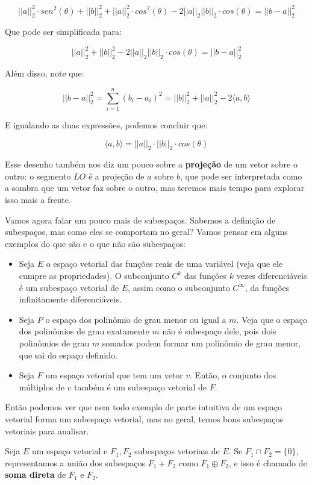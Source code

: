 \documentclass[11pt, a4paper]{article}
\begin{document}
\[||a||_2^2\cdot sen^2(\theta) +||b||_2^2 + ||a||_2^2\cdot cos^2(\theta)-2||a||_2||b||_2\cdot cos(\theta)=||b-a||_2^2\]

Que pode ser simplificada para:

\[||a||_2^2 +||b||_2^2 -2||a||_2||b||_2\cdot cos(\theta)=||b-a||_2^2\]

Além disso, note que:

\[||b-a||_2^2=\sum_{i=1}^{n}{(b_i-a_i)^2}=||b||_2^2+||a||_2^2-2\langle a,b \rangle\]

E igualando as duas expressões, podemos concluir que:

\[\langle a,b \rangle = ||a||_2 \cdot ||b||_2 \cdot cos(\theta)\]

Esse desenho também nos diz um pouco sobre a \textbf{projeção} de um vetor sobre o outro: o segmento \(LO\) é a projeção de \(a\) sobre \(b\), que pode ser interpretada como a sombra que um vetor faz sobre o outro, mas teremos mais tempo para explorar isso mais a frente.

Vamos agora falar um pouco mais de subespaços. Sabemos a definição de subespaços, mas como eles se comportam no geral? Vamos pensar em alguns exemplos do que são e o que não são subespaços:

\begin{itemize}
    \item Seja \(E\) o espaço vetorial das funções reais de uma variável (veja que ele cumpre as propriedades). O subconjunto \(C^{k}\) das funções \(k\) vezes diferenciáveis é um subespaço vetorial de \(E\), assim como o subconjunto \(C^{\infty}\), da funções infinitamente diferenciáveis.

    \item Seja \(P\) o espaço dos polinômio de grau menor ou igual a \(m\). Veja que o espaço dos polinômios de grau exatamente \(m\) não é subespaço dele, pois dois polinômios de grau \(m\) somados podem formar um polinômio de grau menor, que sai do espaço definido.

    \item Seja \(F\) um espaço vetorial que tem um vetor \(v\). Então, o conjunto dos múltiplos de \(v\) também é um subespaço vetorial de \(F\).
\end{itemize}

Então podemos ver que nem todo exemplo de parte intuitiva de um espaço vetorial forma um subespaço vetorial, mas no geral, temos bons subespaços vetoriais para analisar.

Seja \(E\) um espaço vetorial e \(F_1,F_2\) subespaços vetoriais de \(E\). Se \(F_1 \cap F_2=\{0\},\) representamos a união dos subespaços \(F_1+F_2\) como \(F_1 \oplus F_2\), e isso é chamado de \textbf{soma direta} de \(F_1\) e \(F_2\). 
\end{document}
